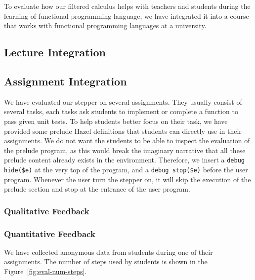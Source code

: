 
To evaluate how our filtered calculus helps with teachers and students during
the learning of functional programming language, we have integrated it into a
course that works with functional programming languages at a university.

\subsection{Lecture Integration}


\subsection{Assignment Integration}

We have evaluated our stepper on several assignments. They usually consist of
several tasks, each tasks ask students to implement or complete a function to
pass given unit tests. To help students better focus on their task, we have
provided some prelude Hazel definitions that students can directly use in their
assignments. We do not want the students to be able to inspect the evaluation of
the prelude program, as this would break the imaginary narrative that all these
prelude content already exists in the environment. Therefore, we insert a
\lstinline[language=hazel]{debug hide($e)} at the very top of the program, and a
\lstinline[language=hazel]{debug stop($e)} before the user program. Whenever the
user turn the stepper on, it will skip the execution of the prelude section and
stop at the entrance of the user program.

\subsubsection{Qualitative Feedback}


\subsubsection{Quantitative Feedback}

We have collected anonymous data from students during one of their
assignments. The number of steps used by students is shown in the
Figure~\ref{fig:eval-num-steps}.

